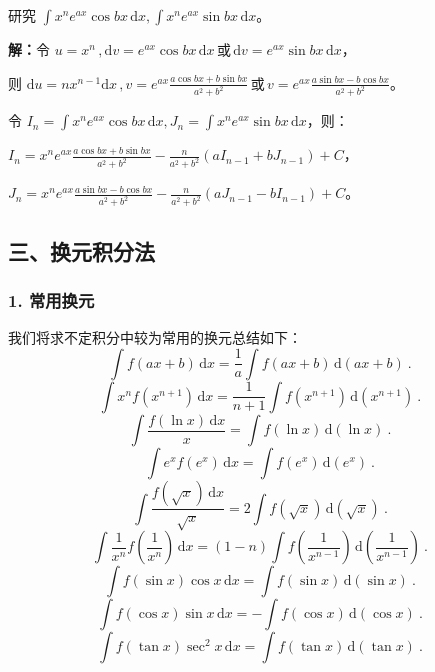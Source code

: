 \begin{corollary}{}
研究 $\displaystyle{\int x^n e^{ax}\cos bx\,\mathrm{d}x,\int x^n e^{ax}\sin bx\,\mathrm {d}x}$。

\textbf{解：}令 $\displaystyle{u=x^n\,,\mathrm{d}v=e^{ax}\cos{bx}\,\mathrm{d}x\,\text{或}\,\mathrm{d}v=e^{ax}\sin{bx}\,\mathrm{d}x}$，

则 $\displaystyle{\mathrm{d}u=nx^{n-1}\mathrm{d}x\,,v=e^{ax}\frac{a\cos bx+b\sin bx}{a^2+b^2}\,\text{或}\,v=e^{ax}\frac{a\sin bx-b\cos bx}{a^2+b^2}}$。

令 $\displaystyle{I_n=\int x^n e^{ax}\cos bx\,\mathrm{d}x},J_n=\int x^n e^{ax}\sin bx\,\mathrm{d}x$，则：

$\displaystyle{I_n=x^n e^{ax}\frac{{a\cos bx+b\sin bx}}{a^2+b^2}-\frac{n}{a^2+b^2}\left(aI_{n-1}+bJ_{n-1}\right)+C}$，

$\displaystyle{J_n=x^n e^{ax}\frac{{a\sin bx-b\cos bx}}{a^2+b^2}-\frac{n}{a^2+b^2}\left(aJ_{n-1}-bI_{n-1}\right)+C}$。
\end{corollary}

\subsection{三、换元积分法}
\subsubsection{1. 常用换元}
我们将求不定积分中较为常用的换元总结如下：
\begin{equation}
\int f(ax+b)\,\mathrm{d}x=\frac{1}{a}\int f(ax+b)\,\mathrm{d}\left(ax+b\right)~.
\end{equation}
\begin{equation}
\int x^nf(x^{n+1})\,\mathrm{d}x=\frac{1}{n+1}\int f(x^{n+1})\,\mathrm{d}(x^{n+1})~.
\end{equation}
\begin{equation}
\int \frac{f(\ln x)\,\mathrm{d}x}{x}=\int f(\ln x)\,\mathrm{d}(\ln x)~.
\end{equation}
\begin{equation}
\int e^xf(e^x)\,\mathrm{d}x=\int f(e^x)\,\mathrm{d}(e^x)~.
\end{equation}
\begin{equation}
\int \frac{f(\sqrt{x})\,\mathrm{d}x}{\sqrt{x}}=2\int f(\sqrt{x})\,\mathrm{d}(\sqrt{x})~.
\end{equation}
\begin{equation}
\int \frac{1}{x^n}f\left(\frac{1}{x^n}\right)\,\mathrm{d}x=(1-n)\int f\left(\frac{1}{x^{n-1}}\right)\,\mathrm{d}\left(\frac{1}{x^{n-1}}\right)~.
\end{equation}
\begin{equation}
\int f(\sin x)\cos x\,\mathrm{d}x=\int f(\sin x)\,\mathrm{d}(\sin x)~.
\end{equation}
\begin{equation}
\int f(\cos x)\sin x\,\mathrm{d}x=-\int f(\cos x)\,\mathrm{d}(\cos x)~.
\end{equation}
\begin{equation}
\int f(\tan x)\sec^2x\,\mathrm{d}x=\int f(\tan x)\,\mathrm{d}(\tan x)~.
\end{equation}


